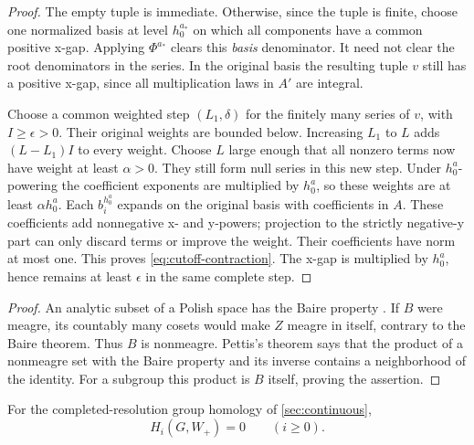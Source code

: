 \begin{proof}
The empty tuple is immediate. Otherwise, since the tuple is finite,
choose one normalized basis at level $h_0^{a_*}$ on which all
components have a common positive x-gap.  Applying $\Phi^{a_*}$ clears this
\emph{basis} denominator.  It need not clear the root denominators
in the series.  In the original basis the resulting tuple $v$ still
has a positive x-gap, since all multiplication laws in $A'$ are
integral.

Choose a common weighted step $(L_1,\delta)$ for the finitely many
series of $v$, with $I\geq\epsilon>0$. Their original weights are
bounded below.
Increasing $L_1$ to $L$ adds $(L-L_1)I$ to every weight.  Choose $L$
large enough that all nonzero terms now have weight at least
$\alpha>0$.  They still form null series in this new step.  Under
$h_0^a$-powering the coefficient exponents are multiplied by $h_0^a$,
so these weights are at least $\alpha h_0^a$.  Each
$b_i^{h_0^a}$ expands on the original basis with coefficients in
$A$.  These coefficients add nonnegative x- and y-powers;
projection to the strictly negative-y part can only discard terms
or improve the weight.  Their coefficients have norm at most one.
This proves \cref{eq:cutoff-contraction}.  The x-gap is multiplied
by $h_0^a$, hence remains at least $\epsilon$ in the same complete
step.
\end{proof}


\begin{proof}
An analytic subset of a Polish space has the Baire property
\citep[Theorem~21.6]{kechris1995}.  If $B$ were meagre, its countably
many cosets would make $Z$ meagre in itself, contrary to the Baire
theorem.  Thus $B$ is nonmeagre.  Pettis's theorem
\citep[Theorem~9.9]{kechris1995} says that the product of a
nonmeagre set with the Baire property and its inverse contains a
neighborhood of the identity.  For a subgroup this product is $B$
itself, proving the assertion.
\end{proof}

\begin{lemma}
\label{lem:cutoff-positive-acyclic}
For the completed-resolution group homology of
\cref{sec:continuous},
\[
 H_i(G,W_+)=0\qquad(i\geq0).
\]
\end{lemma}

